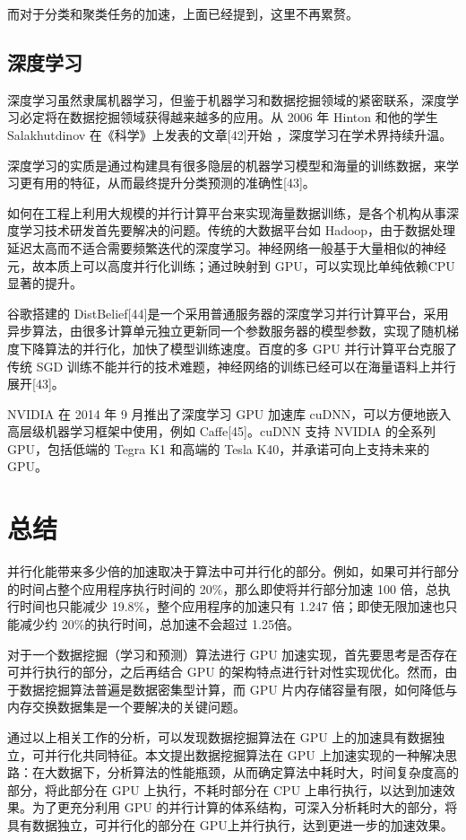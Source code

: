 \documentclass{article}
\begin{document}
\begin{multicols}{2}
    而对于分类和聚类任务的加速，上面已经提到，这里不再累赘。

    \subsection{深度学习}
    深度学习虽然隶属机器学习，但鉴于机器学习和数据挖掘领域的紧密联系，深度学习必定将在数据挖掘领域获得越来越多的应用。从 2006 年 Hinton 和他的学生Salakhutdinov 在《科学》上发表的文章[42]开始 ，深度学习在学术界持续升温。
    
    深度学习的实质是通过构建具有很多隐层的机器学习模型和海量的训练数据，来学习更有用的特征，从而最终提升分类预测的准确性[43]。
    
    如何在工程上利用大规模的并行计算平台来实现海量数据训练，是各个机构从事深度学习技术研发首先要解决的问题。传统的大数据平台如 Hadoop，由于数据处理延迟太高而不适合需要频繁迭代的深度学习。神经网络一般基于大量相似的神经元，故本质上可以高度并行化训练；通过映射到 GPU，可以实现比单纯依赖CPU显著的提升。
    
    谷歌搭建的 DistBelief[44]是一个采用普通服务器的深度学习并行计算平台，采用异步算法，由很多计算单元独立更新同一个参数服务器的模型参数，实现了随机梯度下降算法的并行化，加快了模型训练速度。百度的多 GPU 并行计算平台克服了传统 SGD 训练不能并行的技术难题，神经网络的训练已经可以在海量语料上并行展开[43]。
    
    NVIDIA 在 2014 年 9 月推出了深度学习 GPU 加速库 cuDNN，可以方便地嵌入高层级机器学习框架中使用，例如 Caffe[45]。cuDNN 支持 NVIDIA 的全系列 GPU，包括低端的 Tegra K1 和高端的 Tesla K40，并承诺可向上支持未来的 GPU。

    \section{总结}
    并行化能带来多少倍的加速取决于算法中可并行化的部分。例如，如果可并行部分的时间占整个应用程序执行时间的 20\%，那么即使将并行部分加速 100 倍，总执行时间也只能减少 19.8\%，整个应用程序的加速只有 1.247 倍；即使无限加速也只能减少约 20\%的执行时间，总加速不会超过 1.25倍。
    
    对于一个数据挖掘（学习和预测）算法进行 GPU 加速实现，首先要思考是否存在可并行执行的部分，之后再结合 GPU 的架构特点进行针对性实现优化。然而，由于数据挖掘算法普遍是数据密集型计算，而 GPU 片内存储容量有限，如何降低与内存交换数据集是一个要解决的关键问题。
    
    通过以上相关工作的分析，可以发现数据挖掘算法在 GPU 上的加速具有数据独立，可并行化共同特征。本文提出数据挖掘算法在 GPU 上加速实现的一种解决思路：在大数据下，分析算法的性能瓶颈，从而确定算法中耗时大，时间复杂度高的部分，将此部分在 GPU 上执行，不耗时部分在 CPU 上串行执行，以达到加速效果。为了更充分利用 GPU 的并行计算的体系结构，可深入分析耗时大的部分，将具有数据独立，可并行化的部分在 GPU上并行执行，达到更进一步的加速效果。

    \end{multicols}
\end{document}
